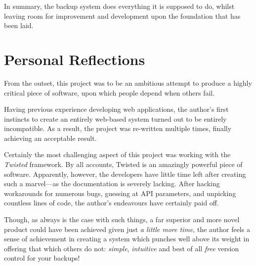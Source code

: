 In summary, the backup system does everything it is supposed to do, whilst
leaving room for improvement and development upon the foundation that has been
laid.

\section{Personal Reflections}

From the outset, this project was to be an ambitious attempt to produce
a highly critical piece of software, upon which people depend when others fail.

Having previous experience developing web applications, the author's first
instincts to create an entirely web-based system turned out to be entirely
incompatible. As a result, the project was re-written multiple times, finally
achieving an acceptable result.

Certainly the most challenging aspect of this project was working with the
\emph{Twisted} framework. By all accounts, Twisted is an amazingly powerful
piece of software. Apparently, however, the developers have little time left
after creating such a marvel---as the documentation is severely lacking. After
hacking workarounds for numerous bugs, guessing at API parameters, and
unpicking countless lines of code, the author's endeavours have certainly paid
off.

Though, as always is the case with such things, a far superior and more novel
product could have been achieved given just \emph{a little more time}, the
author feels a sense of achievement in creating a system which punches well
above its weight in offering that which others do not: \emph{simple},
\emph{intuitive} and best of all \emph{free} version control for your backups!
